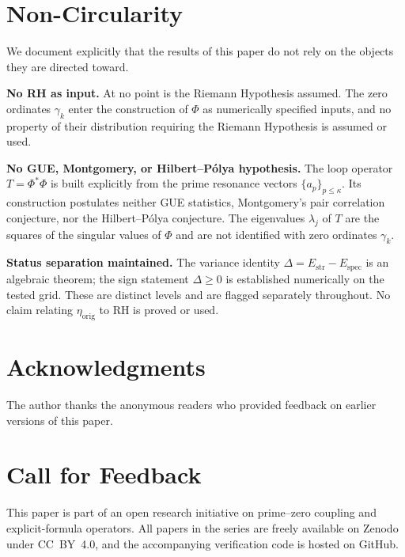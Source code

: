 \documentclass[11pt]{article}
\newcommand{\Estr}{E_{\mathrm{str}}}
\newcommand{\Espec}{E_{\mathrm{spec}}}
\newcommand{\etaorig}{\eta_{\mathrm{orig}}}
\begin{document}
\section*{Non-Circularity}
\label{sec:nocirc}

We document explicitly that the results of this paper do not rely on
the objects they are directed toward.

\textbf{No RH as input.}
At no point is the Riemann Hypothesis assumed.
The zero ordinates $\gamma_k$ enter the construction of $\Phi$ as
numerically specified inputs, and no property of their distribution
requiring the Riemann Hypothesis is assumed or used.

\textbf{No GUE, Montgomery, or Hilbert--P\'olya hypothesis.}
The loop operator $T=\Phi^*\Phi$ is built explicitly from the prime
resonance vectors $\{a_p\}_{p\le\kappa}$. Its construction postulates
neither GUE statistics, Montgomery's pair correlation conjecture, nor
the Hilbert--P\'olya conjecture. The eigenvalues $\lambda_j$ of $T$ are
the squares of the singular values of $\Phi$ and are not identified
with zero ordinates $\gamma_k$.

\textbf{Status separation maintained.}
The variance identity $\Delta=\Estr-\Espec$ is an algebraic theorem;
the sign statement $\Delta\geq 0$ is established numerically on the
tested grid. These are distinct levels and are flagged separately
throughout. No claim relating $\etaorig$ to RH is proved or used.

\section*{Acknowledgments}

The author thanks the anonymous readers who provided feedback on
earlier versions of this paper.

\section*{Call for Feedback}

This paper is part of an open research initiative on prime--zero
coupling and explicit-formula operators.
All papers in the series are freely available on Zenodo under CC~BY~4.0,
and the accompanying verification code is hosted on GitHub.
\end{document}
